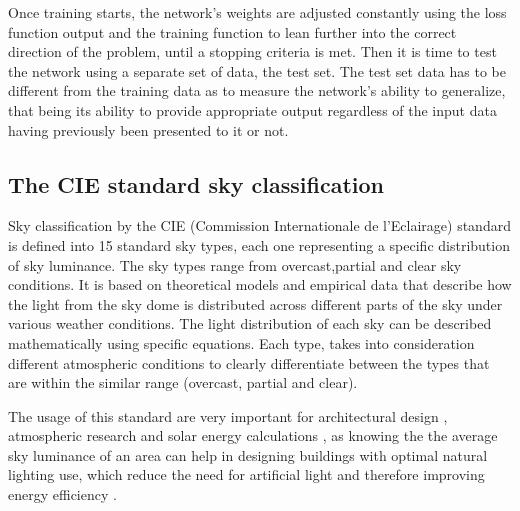  Once training starts, the network's weights are adjusted constantly using the loss function output and the training function to lean further into the correct direction of the problem, until a stopping criteria is met. Then it is time to test the network using a separate set of data, the test set. The test set data has to be different from the training data as to measure the network's ability to generalize, that being its ability to provide appropriate output regardless of the input data having previously been presented to it or not.

\subsection{The CIE standard sky classification}

Sky classification by the CIE (Commission Internationale de l'Eclairage) standard is defined into 15 standard sky types, each one representing a specific distribution of sky luminance. The sky types range from overcast,partial and clear sky conditions. It is based on theoretical models and empirical data that describe how the light from the sky dome is distributed across different parts of the sky under various weather conditions. The light distribution of each sky can be described mathematically using specific equations. Each type, takes into consideration different atmospheric conditions to clearly differentiate between the types that are within the similar range (overcast, partial and clear).

The usage of this standard are very important for architectural design\cite{LI2014563} \cite{ALSHAIBANI2017387}, atmospheric research and solar energy calculations \cite{LI2001435}, as knowing the the average sky luminance of an area can help in designing buildings with optimal natural lighting use, which reduce the need for artificial light and therefore improving energy efficiency \cite{García-Ruiz}.

